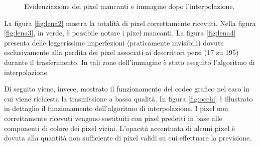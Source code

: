 \begin{figure}[b]
\centering
{}
	\caption{Evidenziazione dei pixel mancanti e immagine dopo l'interpolazione.}
\end{figure}

La figura \ref{fig:lena2} mostra la totalità di pixel correttamente
ricevuti. Nella figura \ref{fig:lena3}, in verde, è possibile notare i pixel
mancanti. La figura \ref{fig:lena4} presenta delle
leggerissime imperfezioni (praticamente invisibili) dovute esclusivamente alla
perdita dei pixel associati ai descrittori persi (17 su 195) durante il trasferimento. In tali zone dell'immagine è stato eseguito l'algoritmo di interpolazione.

Di seguito viene, invece, mostrato il funzionamento del codec grafico
nel caso in cui viene richiesta la trasmissione a bassa qualità. In figura
\ref{fig:occhi} è illustrato in dettaglio il funzionamento dell'algoritmo di interpolazione. I pixel non correttamente
ricevuti vengono sostituiti con pixel predetti in base alle componenti di
colore dei pixel vicini. L'opacità accentuata di alcuni pixel è dovuta alla
quantità non sufficiente di pixel validi su cui effettuare la previsione.

